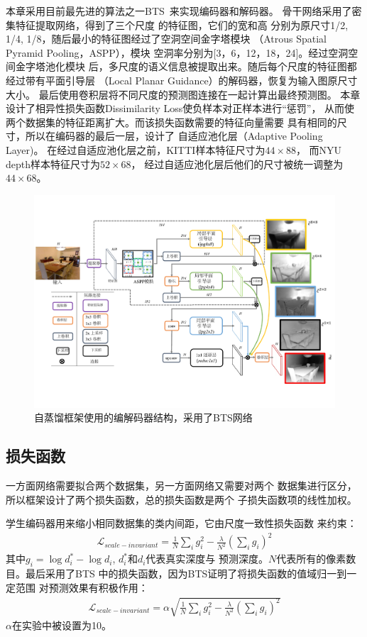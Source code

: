 本章采用目前最先进的算法之一BTS~\cite{bts}来实现编码器和解码器。
骨干网络采用了密集特征提取网络，得到了三个尺度
的特征图，它们的宽和高
分别为原尺寸1/2, 1/4, 1/8，随后最小的特征图经过了空洞空间金字塔模块
（Atrous Spatial Pyramid Pooling，ASPP），模块
空洞率分别为[3，6，12，18，24]。经过空洞空间金字塔池化模块
后，多尺度的语义信息被提取出来。随后每个尺度的特征图都
经过带有平面引导层
（Local Planar Guidance）的解码器，恢复为输入图原尺寸大小。
最后使用卷积层将不同尺度的预测图连接在一起计算出最终预测图。
本章设计了相异性损失函数Dissimilarity Loss使负样本对正样本进行“惩罚”，
从而使两个数据集的特征距离扩大。而该损失函数需要的特征向量需要
具有相同的尺寸，所以在编码器的最后一层，设计了
自适应池化层（Adaptive Pooling Layer)。
在经过自适应池化层之前，KITTI样本特征尺寸为$44\times88$，
而NYU depth样本特征尺寸为$52\times68$，
经过自适应池化层后他们的尺寸被统一调整为$44\times68$。
\begin{figure}[t]
    \centering
  \includegraphics[width=1\linewidth]{figure/Bts_architecture.pdf}
  \centering
       \caption{自蒸馏框架使用的编解码器结构，采用了BTS\cite{bts}网络}
   \label{BTS architecture} 
  \end{figure}
 \subsection{损失函数}
一方面网络需要拟合两个数据集，另一方面网络又需要对两个
数据集进行区分，所以框架设计了两个损失函数，总的损失函数是两个
子损失函数项的线性加权。

学生编码器用来缩小相同数据集的类内间距，它由尺度一致性损失函数
\cite{eigen2014depth}来约束：
\begin{align}
  \mathcal{L}_{scale-invariant} = \frac{1}{N}\sum_{i}g_i^2-\frac{\lambda}{N^2}(\sum_{i}g_i)^2
\end{align}
其中$g_i=\log d_i^*-\log d_i$, $d_i^*$和$d_i$代表真实深度与
预测深度。$N$代表所有的像素数目。最后采用了BTS\cite{bts}
中的损失函数，因为BTS\cite{bts}证明了将损失函数的值域归一到一定范围
对预测效果有积极作用：
\begin{align}
 \mathcal{L}_{scale-invariant} = \alpha\sqrt{\frac{1}{N}\sum_{i}g_i^2-\frac{\lambda}{N^2}(\sum_{i}g_i)^2} 
\end{align}
$\alpha$在实验中被设置为10。

